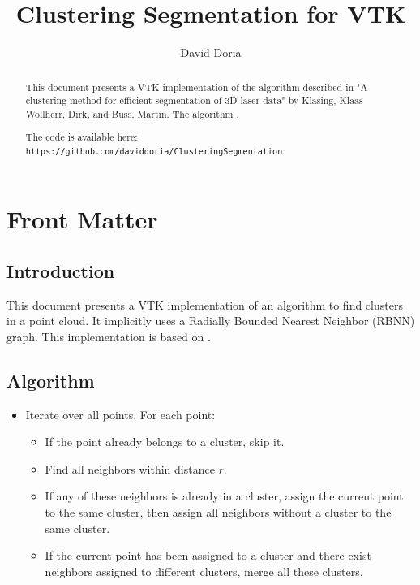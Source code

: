 \documentclass{InsightArticle}
\title{Clustering Segmentation for VTK}
\author{David Doria}
\newcommand{\IJhandlerIDnumber}{3309}
\begin{document}
\IJhandlefooter{\IJhandlerIDnumber}


\ifpdf
\else
\fi


\maketitle


\ifhtml
\chapter*{Front Matter\label{front}}
\fi

\begin{abstract}
\noindent

This document presents a VTK implementation of the algorithm described in 
"A clustering method for efficient segmentation of 3D laser data" by Klasing, Klaas Wollherr, Dirk, and Buss, Martin. The algorithm .

The code is available here:
\verb|https://github.com/daviddoria/ClusteringSegmentation|

\end{abstract}

\IJhandlenote{\IJhandlerIDnumber}

\tableofcontents
\section{Introduction}
This document presents a VTK implementation of an algorithm to find clusters in a point cloud. It implicitly uses a Radially Bounded Nearest Neighbor (RBNN) graph. This implementation is based on \cite{klasing}.

\section{Algorithm}
\label{sec:Algorithm}
\begin{itemize}
 \item Iterate over all points. For each point:
   \begin{itemize}
    \item If the point already belongs to a cluster, skip it.
    \item Find all neighbors within distance $r$.
    \item If any of these neighbors is already in a cluster, assign the current point to the same cluster, then assign all neighbors without a cluster to the same cluster.
    \item If the current point has been assigned to a cluster and there exist neighbors assigned to different clusters, merge all these clusters.
  \end{itemize}
\end{itemize}
\end{document}

